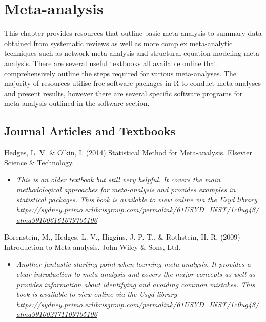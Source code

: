 \documentclass[
]{book}
\providecommand{\tightlist}{%
  \setlength{\itemsep}{0pt}\setlength{\parskip}{0pt}}
\begin{document}
\chapter{Meta-analysis}\label{meta-analysis}

This chapter provides resources that outline basic meta-analysis to summary data obtained from systematic reviews as well as more complex meta-analytic techniques such as network meta-analysis and structural equation modeling meta-analysis. There are several useful textbooks all available online that comprehensively outline the steps required for various meta-analyses. The majority of resources utilise free software packages in R to conduct meta-analyses and present results, however there are several specific software programs for meta-analysis outlined in the software section.

\section{Journal Articles and Textbooks}\label{journal-articles-and-textbooks-4}

Hedges, L. V. \& Olkin, I. (2014) Statistical Method for Meta-analysis. Elsevier Science \& Technology.

\begin{itemize}
\tightlist
\item
  \emph{This is an older textbook but still very helpful. It covers the main methodological approaches for meta-analysis and provides examples in statistical packages. This book is available to view online via the Usyd library \url{https://sydney.primo.exlibrisgroup.com/permalink/61USYD_INST/1c0ug48/alma991006161679705106} }
\end{itemize}

Borenstein, M., Hedges, L. V., Higgins, J. P. T., \& Rothstein, H. R. (2009) Introduction to Meta-analysis. John Wiley \& Sons, Ltd.~

\begin{itemize}
\tightlist
\item
  \emph{Another fantastic starting point when learning meta-analysis. It provides a clear introduction to meta-analysis and covers the major concepts as well as provides information about identifying and avoiding common mistakes. This book is available to view online via the Usyd library \url{https://sydney.primo.exlibrisgroup.com/permalink/61USYD_INST/1c0ug48/alma991002771109705106} }
\end{itemize}
\end{document}
